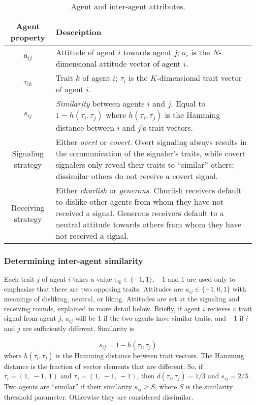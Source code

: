 \documentclass[11pt,letterpaper]{article}
\begin{document}
\begin{table}[H]
  \centering
  \begin{tabular}{cp{4.5in}}
    Agent property & Description \\
    \toprule
    $a_{ij}$   & Attitude of agent $i$ towards agent $j$; $a_i$ is the $N$-dimensional 
      attitude vector of agent $i$. \\
    $\tau_{ik}$ & Trait $k$ of agent $i$; $\tau_i$ is the $K$-dimensional trait vector of agent $i$. \\
    $s_{ij}$   & \emph{Similarity} between agents $i$ and $j$. Equal to $1-h(\tau_i,\tau_j)$ 
                 where $h(\tau_i, \tau_j)$ is the Hamming distance between 
                 $i$ and $j$'s trait vectors. \\ 
    Signaling strategy & Either \emph{overt} or \emph{covert}. Overt signaling always
                         results in the communication of the signaler's traits,
                         while covert signalers only reveal their traits to 
                         ``similar'' others; dissimilar others do not receive a covert signal. \\
    Receiving strategy & Either \emph{churlish} or \emph{generous}. Churlish
                         receivers default to dislike other agents from whom they have
                         not received a signal. Generous receivers default to
                         a neutral attitude towards others from whom they have
                         not received a signal.
  \end{tabular}
  \caption{Agent and inter-agent attributes.}
  \label{tab:agentAttributes}
\end{table}


\subsubsection{Determining inter-agent similarity}

Each trait $j$ of agent $i$ takes a value $\tau_{ik} \in \{-1, 1\}$. $-1$ and 1
are used only to emphasize that there are two opposing traits.
Attitudes are $a_{ij} \in \{-1, 0, 1\}$ with meanings of 
disliking, neutral, or liking. Attitudes are set at the signaling and receiving
rounds, explained in more detail below. Briefly, if agent $i$ recieves a
trait signal from agent $j$, $a_{ij}$ will be 1 if the two agents have
similar traits, and $-1$ if $i$ and $j$ are sufficiently different. Similarity
is 

\begin{equation}
  s_{ij} = 1 - h(\tau_i, \tau_j)
  \label{eq:similarity}
\end{equation}
\noindent
where $h(\tau_i, \tau_j)$ is the
Hamming distance between trait vectors. The Hamming distance is the fraction
of vector elements that are different. So, if $\tau_i = (1,~-1,~1)$ and
$\tau_j = (1,~-1,~-1)$, then $d(\tau_i, \tau_j) = 1/3$ and $s_{ij}=2/3$.
Two agents are ``similar'' if their similarity $s_{ij} \geq S$, where
$S$ is the similarity threshold parameter. Otherwise they are considered
dissimilar. 
\end{document}
